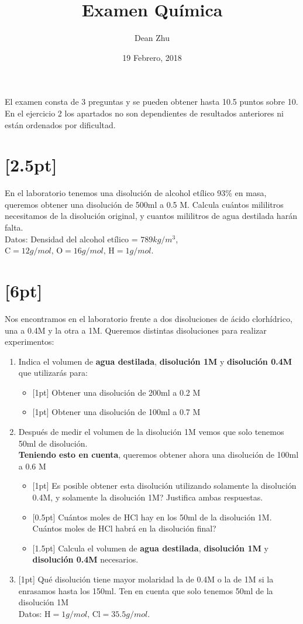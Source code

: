 \documentclass[11pt]{article}
\date{19 Febrero, 2018}
\title{Examen Química}
\author{Dean Zhu}
\begin{document}
\maketitle
\thispagestyle{empty}
El examen consta de 3 preguntas y se pueden obtener hasta 10.5 puntos sobre 10. En el ejercicio 2 los apartados no son dependientes de resultados anteriores ni están ordenados por dificultad. 
\section{[2.5pt]}
\label{sec:org220dcd1}
En el laboratorio tenemos una disolución de alcohol etílico 93\% en masa, queremos obtener una disolución de 500ml a 0.5 M. Calcula cuántos mililitros necesitamos de la disolución original, y cuantos mililitros de agua destilada harán falta. \\
Datos: Densidad del alcohol etílico = \(789kg/m^{3}\), \(\text{C} = 12g/mol \text{, O} = 16g/mol \text{, H} = 1g/mol \).

\section{[6pt]}
\label{sec:org466d254}
Nos encontramos en el laboratorio frente a dos disoluciones de ácido clorhídrico, una a 0.4M y la otra a 1M. Queremos distintas disoluciones para realizar experimentos:
\begin{enumerate}[label=\Alph*)]
\item Indica el volumen de \textbf{agua destilada}, \textbf{disolución 1M} y \textbf{disolución 0.4M} que utilizarás para: 
    \begin{itemize}
    \item {[1pt]} Obtener una disolución de 200ml a 0.2 M
    \item {[1pt]} Obtener una disolución de 100ml a 0.7 M
    \end{itemize}
  \item Después de medir el volumen de la disolución 1M vemos que solo tenemos 50ml de disolución. \\
    \textbf{Teniendo esto en cuenta}, queremos obtener ahora una disolución de 100ml a 0.6 M
    \begin{itemize}
    \item {[1pt]} Es posible obtener esta disolución utilizando solamente la disolución 0.4M, y solamente la disolución 1M? Justifica ambas respuestas.
    \item {[0.5pt]} Cuántos moles de HCl hay en los 50ml de la disolución 1M. Cuántos moles de HCl habrá en la disolución final?
    \item {[1.5pt]} Calcula el volumen de \textbf{agua destilada}, \textbf{disolución 1M} y \textbf{disolución 0.4M} necesarios.  \\
    \end{itemize}
  \item {[1pt]} Qué disolución tiene mayor molaridad la de 0.4M o la de 1M si la enrasamos hasta los 150ml. Ten en cuenta que solo tenemos 50ml de la disolución 1M \\
      Datos: \(\text{H} = 1g/mol \text{, Cl} = 35.5g/mol \).
  \end{enumerate}
\end{document}
